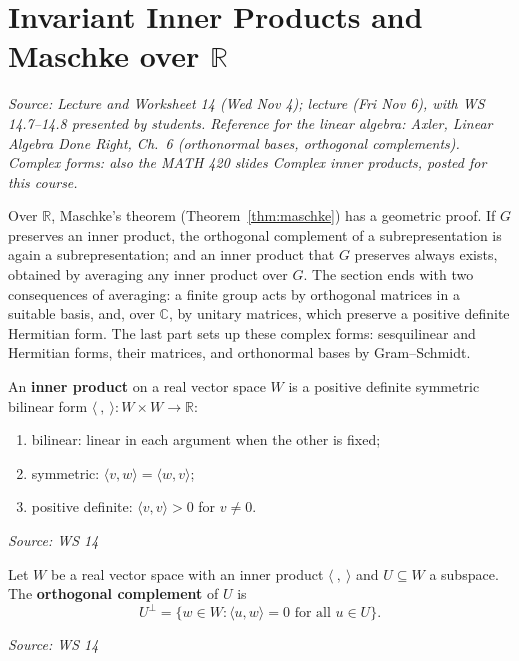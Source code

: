 \documentclass[11pt]{report}
\newcommand{\srcline}[1]{\par\hfill{\footnotesize\textit{Source: #1}}}
\begin{document}
\section{\texorpdfstring{Invariant Inner Products and Maschke over $\mathbb{R}$}{Invariant Inner Products and Maschke over R}}\label{sec:invariant-inner-products}

\textit{Source: Lecture and Worksheet 14 (Wed Nov 4); lecture (Fri Nov 6), with WS 14.7--14.8 presented by students. Reference for the linear algebra: Axler, \emph{Linear Algebra Done Right}, Ch.~6 (orthonormal bases, orthogonal complements). Complex forms: also the MATH 420 slides \emph{Complex inner products}, posted for this course.}

Over $\mathbb{R}$, Maschke's theorem (Theorem~\ref{thm:maschke}) has a geometric proof. If $G$ preserves an inner product, the orthogonal complement of a subrepresentation is again a subrepresentation; and an inner product that $G$ preserves always exists, obtained by averaging any inner product over $G$. The section ends with two consequences of averaging: a finite group acts by orthogonal matrices in a suitable basis, and, over $\mathbb{C}$, by unitary matrices, which preserve a positive definite Hermitian form. The last part sets up these complex forms: sesquilinear and Hermitian forms, their matrices, and orthonormal bases by Gram--Schmidt.

\begin{defbox}\label{def:inner-product-real}
An \textbf{inner product} on a real vector space $W$ is a positive definite symmetric bilinear form $\langle\ ,\ \rangle: W \times W \to \mathbb{R}$:
\begin{enumerate}
    \item bilinear: linear in each argument when the other is fixed;
    \item symmetric: $\langle v, w \rangle = \langle w, v \rangle$;
    \item positive definite: $\langle v, v \rangle > 0$ for $v \neq 0$.
\end{enumerate}
\srcline{WS 14}
\end{defbox}

\begin{defbox}\label{def:orthogonal-complement}
Let $W$ be a real vector space with an inner product $\langle\ ,\ \rangle$ and $U \subseteq W$ a subspace. The \textbf{orthogonal complement} of $U$ is
\[ U^\perp = \{ w \in W : \langle u, w \rangle = 0 \text{ for all } u \in U \}. \]
\srcline{WS 14}
\end{defbox}
\end{document}
